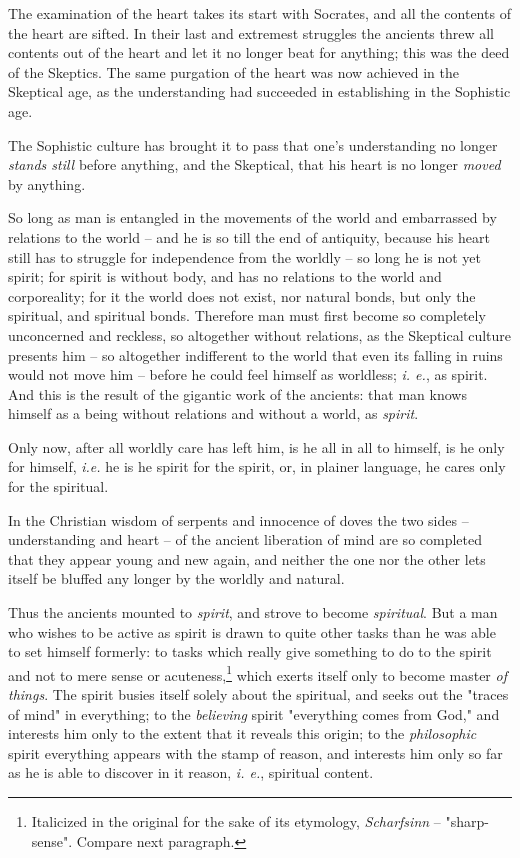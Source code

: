 The examination of the heart takes its start with Socrates, and all the 
contents of the heart are sifted. In their last and extremest struggles the 
ancients threw all contents out of the heart and let it no longer beat for 
anything; this was the deed of the Skeptics. The same purgation of the heart 
was now achieved in the Skeptical age, as the understanding had succeeded in 
establishing in the Sophistic age.

The Sophistic culture has brought it to pass that one's understanding no 
longer \textit{stands still} before anything, and the Skeptical, that his 
heart is no longer \textit{moved} by anything.

So long as man is entangled in the movements of the world and embarrassed by 
relations to the world -- and he is so till the end of antiquity, because his 
heart still has to struggle for independence from the worldly -- so long he is 
not yet spirit; for spirit is without body, and has no relations to the world 
and corporeality; for it the world does not exist, nor natural bonds, but only 
the spiritual, and spiritual bonds. Therefore man must first become so 
completely unconcerned and reckless, so altogether without relations, as the 
Skeptical culture presents him -- so altogether indifferent to the world that 
even its falling in ruins would not move him -- before he could feel himself 
as worldless; \textit{i. e.}, as spirit. And this is the result of the 
gigantic work of the ancients: that man knows himself as a being without 
relations and without a world, as \textit{spirit}.

Only now, after all worldly care has left him, is he all in all to himself, is 
he only for himself, \textit{i.e.} he is he spirit for the spirit, or, in 
plainer language, he cares only for the spiritual.

In the Christian wisdom of serpents and innocence of doves the two sides -- 
understanding and heart -- of the ancient liberation of mind are so completed 
that they appear young and new again, and neither the one nor the other lets 
itself be bluffed any longer by the worldly and natural.

Thus the ancients mounted to \textit{spirit}, and strove to become 
\textit{spiritual}. But a man who wishes to be active as spirit is drawn to 
quite other tasks than he was able to set himself formerly: to tasks which 
really give something to do to the spirit and not to mere sense or 
acuteness,\footnote{Italicized in the original for the sake of its etymology, 
\textit{Scharfsinn} -- "{}sharp-sense"{}. Compare next paragraph.} which 
exerts itself only to become master \textit{of things}. The spirit busies 
itself solely about the spiritual, and seeks out the "{}traces of mind"{} in 
everything; to the \textit{believing} spirit "{}everything comes from God,"{} 
and interests him only to the extent that it reveals this origin; to the 
\textit{philosophic} spirit everything appears with the stamp of reason, and 
interests him only so far as he is able to discover in it reason, \textit{i. 
e.}, spiritual content.

